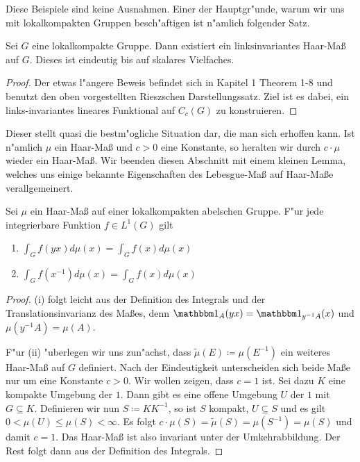 	Diese Beispiele sind keine Ausnahmen.
	Einer der Hauptgr"unde, warum wir uns mit lokalkompakten Gruppen besch"aftigen ist n"amlich folgender Satz.
	\begin{satz}
	\label{satz:topo:haarmeasure}
		Sei $G$ eine lokalkompakte Gruppe. Dann existiert ein linksinvariantes Haar-Maß auf $G$. Dieses ist eindeutig bis auf skalares Vielfaches.
	\end{satz}
	\begin{proof}
		Der etwas l"angere Beweis befindet sich in \textcite{rama} Kapitel 1 Theorem 1-8 und benutzt den oben vorgestellten Rieszschen Darstellungssatz.
		Ziel ist es dabei, ein links-invariantes lineares Funktional auf $C_c(G)$ zu konstruieren.
	\end{proof}
	Dieser stellt quasi die bestm"ogliche Situation dar, die man sich erhoffen kann. 
	Ist n"amlich $\mu$ ein Haar-Maß und $c>0$ eine Konstante, so heralten wir durch $c\cdot \mu$ wieder ein Haar-Maß. 
	Wir beenden diesen Abschnitt mit einem kleinen Lemma, welches uns einige bekannte Eigenschaften des Lebesgue-Maß auf Haar-Maße verallgemeinert.
	\begin{lemma}Sei $\mu$ ein Haar-Maß auf einer lokalkompakten abelschen Gruppe. F"ur jede integrierbare Funktion $f\in L^{1}(G)$ gilt
		\begin{multicols}{2}
			\begin{enumerate}[label=\emph{(\roman*)}]
				\item $\int_{G} f(yx)d\mu(x) =  \int_{G} f(x)d\mu(x)$
				\item $\int_{G} f(x^{-1})d\mu(x) = \int_{G} f(x)d\mu(x)$
			\end{enumerate}
		\end{multicols}
	\end{lemma}
	\begin{proof}
		(i) folgt leicht aus der Definition des Integrals und der Translationsinvarianz des Maßes, denn $\ind_A(yx) = \ind_{y^{-1}A}(x)$ und $\mu({y^{-1}A}) = \mu(A)$.
		
		F"ur (ii) "uberlegen wir uns zun"achst, dass $\tilde{\mu}(E)\coloneqq  \mu(E^{-1})$ ein weiteres Haar-Maß auf $G$ definiert. 
		Nach der Eindeutigkeit unterscheiden sich beide Maße nur um eine Konstante $c > 0$. Wir wollen zeigen, dass $c=1$ ist.
		Sei dazu $K$ eine kompakte Umgebung der $1$. Dann gibt es eine offene Umgebung $U$ der $1$ mit $G \subseteq K$. Definieren wir nun $S \coloneqq  KK^{-1}$, so ist $S$ kompakt, $U \subseteq S$ und es gilt $0 < \mu(U) \leq \mu(S)<\infty$. 
		Es folgt $ c\cdot \mu(S) = \tilde{\mu}(S) = \mu(S^{-1}) =\mu(S)$ und damit $c=1$. Das Haar-Maß ist also invariant unter der Umkehrabbildung. Der Rest folgt dann aus der Definition des Integrals.
	\end{proof}
	
